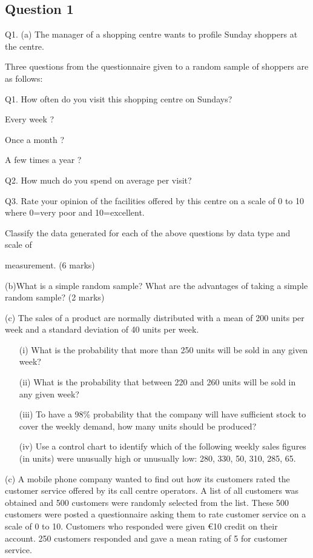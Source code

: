 \documentclass[]{article}
\begin{document}
	
	\Large
\newpage
\subsection*{Question 1}

Q1. (a) The manager of a shopping centre wants to profile Sunday shoppers at the centre.

Three questions from the questionnaire given to a random sample of shoppers are as follows:

\begin{framed}
Q1. How often do you visit this shopping centre on Sundays?

Every week ?

Once a month ?

A few times a year ?

Q2. How much do you spend on average per visit?

Q3. Rate your opinion of the facilities offered by this centre on a scale of 0 to 10 where 0=very poor and 10=excellent.
\end{framed}

Classify the data generated for each of the above questions by data type and scale of

measurement. (6 marks)

(b)What is a simple random sample? What are the advantages of taking a simple random sample? (2 marks)

\newpage

(c) The sales of a product are normally distributed with a mean of 200 units per week and a standard deviation of 40 units per week.

\begin{itemize}
\item[(i)] What is the probability that more than 250 units will be sold in any given week?

\item[(ii)] What is the probability that between 220 and 260 units will be sold in any given week?

\item[(iii)] To have a 98\% probability that the company will have sufficient stock to cover the weekly demand, how many units should be produced?

\item[(iv)] Use a control chart to identify which of the following weekly sales figures (in units) were unusually high or unusually low: 280, 330, 50, 310, 285, 65.

\end{itemize}
\newpage
(c) A mobile phone company wanted to find out how its customers rated the customer service offered by its call centre operators. A list of all customers was obtained and 500 customers were randomly selected from the list. These 500 customers were posted a questionnaire asking them to rate customer service on a scale of 0 to 10. Customers who responded were given €10 credit on their account. 250 customers responded and gave a mean rating of 5 for customer service.
\end{document}
